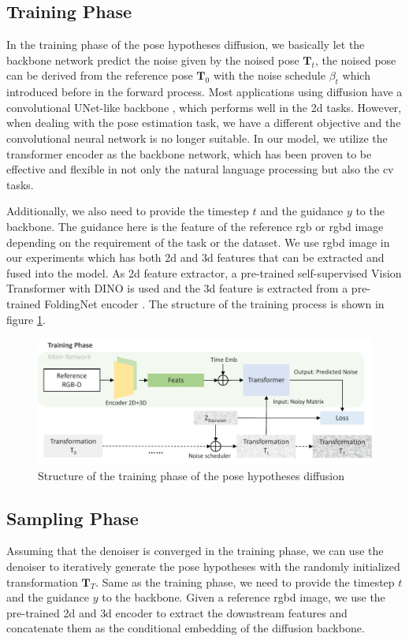\documentclass[12pt,DIV14,BCOR12mm,a4paper,footinclude=false,headinclude,parskip=half-,twoside,openright,cleardoublepage=empty,toc=index,bibliography=totoc,listof=totoc]{scrreprt}
\numberwithin{equation}{chapter}
\begin{document}
\subsection{Training Phase}
In the training phase of the pose hypotheses diffusion, we basically let the backbone network predict the noise given by the noised pose $\mathbf{T}_{t}$, the noised pose can be derived from the reference pose $\mathbf{T}_{0}$ with the noise schedule $\beta_{t}$ which introduced before in the forward process. Most applications using diffusion have a convolutional UNet-like backbone \cite{ronneberger2015unet}, which performs well in the \gls{2d} tasks. However, when dealing with the pose estimation task, we have a different objective and the convolutional neural network is no longer suitable. In our model, we utilize the transformer encoder as the backbone network, which has been proven to be effective and flexible in not only the natural language processing but also the \gls{cv} tasks.

Additionally, we also need to provide the timestep $t$ and the guidance $y$ to the backbone. The guidance here is the feature of the reference \gls{rgb} or \gls{rgbd} image depending on the requirement of the task or the dataset. We use \gls{rgbd} image in our experiments which has both \gls{2d} and \gls{3d} features that can be extracted and fused into the model. As \gls{2d} feature extractor, a pre-trained self-supervised Vision Transformer
 with DINO \cite{caron2021emerging} is used and the \gls{3d} feature is extracted from a pre-trained FoldingNet encoder \cite{yang2018foldingnet}. The structure of the training process is shown in figure \ref{img:train}.

\begin{figure}[h]
	\centering
	\includegraphics[width=1.0\textwidth]{img/train.pdf}
	\caption{Structure of the training phase of the pose hypotheses diffusion}
	\label{img:train}
\end{figure}

\subsection{Sampling Phase}
Assuming that the denoiser is converged in the training phase, we can use the denoiser to iteratively generate the pose hypotheses with the randomly initialized transformation $\mathbf{T}_{T}$. Same as the training phase, we need to provide the timestep $t$ and the guidance $y$ to the backbone. Given a reference \gls{rgbd} image, we use the pre-trained \gls{2d} and \gls{3d} encoder to extract the downstream features and concatenate them as the conditional embedding of the diffusion backbone. 
\end{document}
